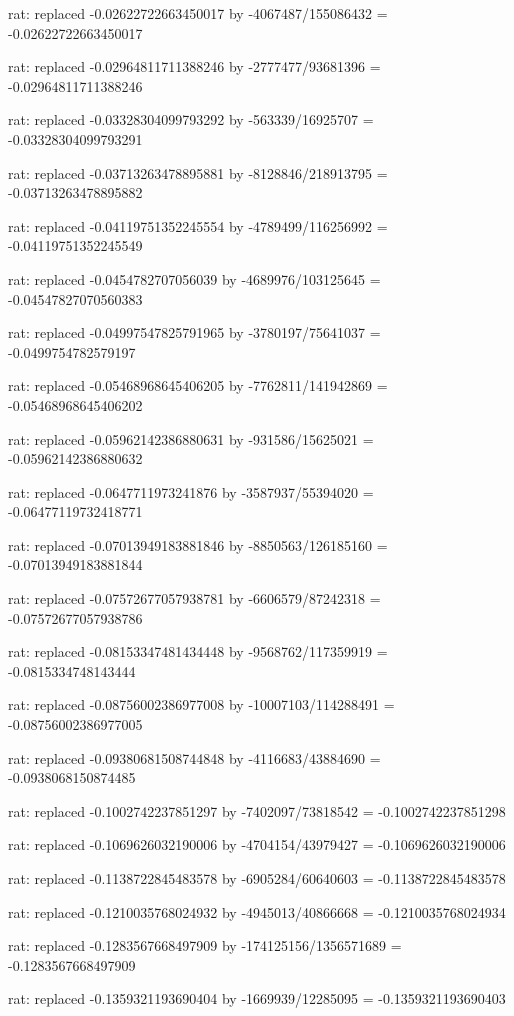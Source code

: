 \documentclass[a4paper,10pt]{article}
\begin{document}
\begin{eulernotebook}
\begin{eulercomment}
\begin{eulercomment}
\begin{eulercomment}
\begin{eulercomment}
\begin{eulercomment}
\begin{eulercomment}
\begin{eulercomment}
\begin{eulercomment}
\begin{eulercomment}
\begin{eulercomment}
\begin{eulercomment}
\begin{eulercomment}
\begin{eulercomment}
\begin{eulercomment}
\begin{eulercomment}
\begin{eulercomment}
\begin{euleroutput}
  rat: replaced -0.02622722663450017 by -4067487/155086432 = -0.02622722663450017
  
  rat: replaced -0.02964811711388246 by -2777477/93681396 = -0.02964811711388246
  
  rat: replaced -0.03328304099793292 by -563339/16925707 = -0.03328304099793291
  
  rat: replaced -0.03713263478895881 by -8128846/218913795 = -0.03713263478895882
  
  rat: replaced -0.04119751352245554 by -4789499/116256992 = -0.04119751352245549
  
  rat: replaced -0.0454782707056039 by -4689976/103125645 = -0.04547827070560383
  
  rat: replaced -0.04997547825791965 by -3780197/75641037 = -0.0499754782579197
  
  rat: replaced -0.05468968645406205 by -7762811/141942869 = -0.05468968645406202
  
  rat: replaced -0.05962142386880631 by -931586/15625021 = -0.05962142386880632
  
  rat: replaced -0.0647711973241876 by -3587937/55394020 = -0.06477119732418771
  
  rat: replaced -0.07013949183881846 by -8850563/126185160 = -0.07013949183881844
  
  rat: replaced -0.07572677057938781 by -6606579/87242318 = -0.07572677057938786
  
  rat: replaced -0.08153347481434448 by -9568762/117359919 = -0.0815334748143444
  
  rat: replaced -0.08756002386977008 by -10007103/114288491 = -0.08756002386977005
  
  rat: replaced -0.09380681508744848 by -4116683/43884690 = -0.0938068150874485
  
  rat: replaced -0.1002742237851297 by -7402097/73818542 = -0.1002742237851298
  
  rat: replaced -0.1069626032190006 by -4704154/43979427 = -0.1069626032190006
  
  rat: replaced -0.1138722845483578 by -6905284/60640603 = -0.1138722845483578
  
  rat: replaced -0.1210035768024932 by -4945013/40866668 = -0.1210035768024934
  
  rat: replaced -0.1283567668497909 by -174125156/1356571689 = -0.1283567668497909
  
  rat: replaced -0.1359321193690404 by -1669939/12285095 = -0.1359321193690403
  

\end{euleroutput}
\end{eulercomment}
\end{eulercomment}
\end{eulercomment}
\end{eulercomment}
\end{eulercomment}
\end{eulercomment}
\end{eulercomment}
\end{eulercomment}
\end{eulercomment}
\end{eulercomment}
\end{eulercomment}
\end{eulercomment}
\end{eulercomment}
\end{eulercomment}
\end{eulercomment}
\end{eulercomment}
\end{eulernotebook}
\end{document}
